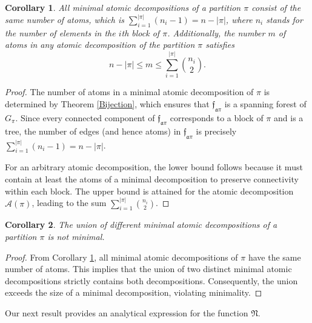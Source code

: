 \documentclass[12pt]{extarticle}
\newtheorem{Corollary}{Corollary}
\begin{document}
	\begin{Corollary}\label{allminimalsamesize}
		All minimal atomic decompositions of a partition $\pi$ consist of the same number of atoms, which is $\displaystyle \sum_{i=1}^{|\pi|} \left(n_i-1\right)=n-|\pi|$, where $n_i$ stands for the number of elements in the $i$th block of $\pi$. Additionally, the number $m$ of atoms in any atomic decomposition of the partition $\pi$ satisfies 
		\begin{equation}
	n-|\pi| \leq m\leq \sum_{i=1}^{|\pi|} \binom{n_i}{2}.
		\end{equation}
	\end{Corollary}
	\begin{proof}  The number of atoms in a minimal atomic decomposition of $\pi$ is determined by Theorem \ref{Bijection}, which ensures that $\mathfrak{f}_{\mathfrak{a}{\pi}}$ is a spanning forest of $G_{\pi}$. Since every connected component of $\mathfrak{f}_{\mathfrak{a}{\pi}}$ corresponds to a block of $\pi$ and is a tree, the number of edges (and hence atoms) in $\mathfrak{f}_{\mathfrak{a}{\pi}}$ is precisely $\sum_{i=1}^{|\pi|} (n_i - 1)=n-|\pi|$.
		
		For an arbitrary atomic decomposition, the lower bound follows because it must contain at least the atoms of a minimal decomposition to preserve connectivity within each block. The upper bound is attained for the atomic decomposition $\mathcal{A}(\pi)$, leading to the sum $\sum_{i=1}^{|\pi|} \binom{n_i}{2}$.
	\end{proof}
	
	\begin{Corollary}\label{not minimal}
		The union of different minimal atomic decompositions of a partition $\pi$ is not minimal.
	\end{Corollary}
	\begin{proof} From Corollary \ref{allminimalsamesize}, all minimal atomic decompositions of $\pi$ have the same number of atoms. This implies that the union of two distinct minimal atomic decompositions strictly contains both decompositions. Consequently, the union exceeds the size of a minimal decomposition, violating minimality.
	\end{proof}
	
	Our next result provides an analytical expression for the function $\mathfrak{N}$.
	
\end{document}
